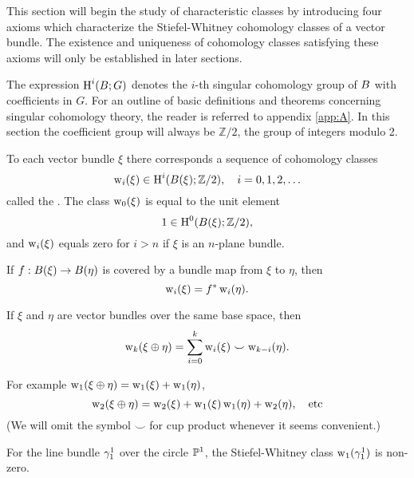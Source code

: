 \documentclass[../main]{subfiles}
\begin{document}
This section will begin the study of characteristic classes by introducing four axioms which characterize the Stiefel-Whitney cohomology classes of a vector bundle. The existence and uniqueness of cohomology classes satisfying these axioms will only be established in later sections.

The expression $\operatorname{H}^i(B;G)$ denotes the $i$-th singular cohomology group of $B$ with coefficients in $G$. For an outline of basic definitions and theorems concerning singular cohomology theory, the reader is referred to appendix \ref{app:A}. In this section the coefficient group will always be $\mathbb{Z} / 2$, the group of integers modulo 2.

\begin{axiom}
\label{axi:04.01}
To each vector bundle $\xi$ there corresponds a sequence of cohomology classes
\[
\operatorname{w}_i(\xi) \in \operatorname{H}^i(B(\xi); \mathbb{Z} / 2), \quad i=0,1,2, \ldots
\]
called the . The class $\operatorname{w}_0(\xi)$ is equal to the unit element
\[
1 \in \operatorname{H}^0(B(\xi); \mathbb{Z} / 2),
\]
and $\operatorname{w}_i(\xi)$ equals zero for $i > n$ if $\xi$ is an $n$-plane bundle.
\end{axiom}

\begin{axiom}[Naturality]
\label{axi:04.02}
If $f:B(\xi) \rightarrow B(\eta)$ is covered by a bundle map from $\xi$ to $\eta$, then
\[
\operatorname{w}_i(\xi) = f^*\operatorname{w}_i(\eta).
\]
\end{axiom}

\begin{axiom}
\label{axi:04.03}
If $\xi$ and $\eta$ are vector bundles over the same base space, then
\[
\operatorname{w}_k(\xi \oplus \eta)=\sum_{i=0}^{k} \operatorname{w}_i(\xi) \smile \operatorname{w}_{k-i}(\eta).
\]
\end{axiom}
For example $\operatorname{w}_1(\xi \oplus \eta)=\operatorname{w}_1(\xi)+\operatorname{w}_1(\eta)$, 
\[
\operatorname{w}_2(\xi \oplus \eta)=\operatorname{w}_2(\xi)+\operatorname{w}_1(\xi) \operatorname{w}_1(\eta)+\operatorname{w}_2(\eta), \quad \text{etc}
\]
(We will omit the symbol $\smile$ for cup product whenever it seems convenient.)

\begin{axiom}
\label{axi:04.04}
For the line bundle $\gamma_{1}^{1}$ over the circle $\mathbb{P}^{1}$, the Stiefel-Whitney class $\operatorname{w}_{1}(\gamma_{1}^{1})$ is non-zero.
\end{axiom}
\end{document}
